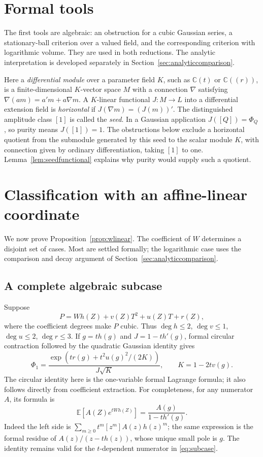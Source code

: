 \documentclass[11pt]{article}
\theoremstyle{definition}\newtheorem{definition}[theorem]{Definition}
\theoremstyle{remark}\newtheorem{remark}[theorem]{Remark}
\newcommand{\E}{\mathbb E}
\newcommand{\C}{\mathbb C}
\begin{document}
\section{Formal tools}\label{sec:formaltools}
The first tools are algebraic: an obstruction for a cubic Gaussian
series, a stationary-ball criterion over a valued field, and the
corresponding criterion with logarithmic volume. They are used in both
reductions. The analytic interpretation is developed separately in
Section~\ref{sec:analyticcomparison}.

Here a \emph{differential module} over a parameter field $K$, such as
$\C(t)$ or $\C((r))$, is a finite-dimensional $K$-vector space $M$
with a connection $\nabla$ satisfying
$\nabla(am)=a'm+a\nabla m$. A $K$-linear functional $J:M\to L$
into a differential extension field is \emph{horizontal} if
$J(\nabla m)=(J(m))'$. The distinguished amplitude class $[1]$ is
called the \emph{seed}. In a Gaussian application
$J([Q])=\Phi_Q$, so purity means $J([1])=1$.
The obstructions below exclude a horizontal quotient from the
submodule generated by this seed to the scalar module $K$, with
connection given by ordinary differentiation, taking $[1]$ to one.
Lemma~\ref{lem:seedfunctional} explains why purity would supply such
a quotient.





\section{Classification with an affine-linear coordinate}
\label{sec:affineclassification}
We now prove Proposition~\ref{prop:wlinear}. The coefficient of $W$
determines a disjoint set of cases. Most are settled formally; the
logarithmic case uses the comparison and decay argument of
Section~\ref{sec:analyticcomparison}.


\subsection{A complete algebraic subcase}\label{sec:algebraic}
Suppose
\[
 P=W h(Z)+v(Z)T^2+u(Z)T+r(Z),
\]
where the coefficient degrees make $P$ cubic. Thus
$\deg h\leq2$, $\deg v\leq1$, $\deg u\leq2$, $\deg r\leq3$.
If $g=th(g)$ and $J=1-th'(g)$, formal circular contraction followed
by the quadratic Gaussian identity gives
\begin{equation}\label{eq:subcase}
 \Phi_1=
 \frac{\exp\!\left(tr(g)+t^2u(g)^2/(2K)\right)}{J\sqrt K},
 \qquad K=1-2tv(g).
\end{equation}
The circular identity here is the one-variable formal Lagrange formula;
it also follows directly from coefficient extraction. For completeness,
for any numerator $A$, its formula is
\[
 \E[A(Z)e^{tWh(Z)}]=\frac{A(g)}{1-th'(g)}.
\]
Indeed the left side is $\sum_{m\geq0}t^m[z^m]A(z)h(z)^m$;
the same expression is the formal residue of $A(z)/(z-th(z))$,
whose unique small pole is $g$. The identity remains valid for the
$t$-dependent numerator in \eqref{eq:subcase}.
\end{document}
